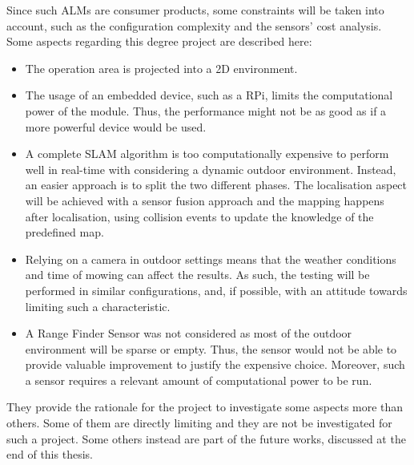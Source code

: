 
Since such \glspl{ALM} are consumer products, some constraints will be taken into account, such as the configuration complexity and the sensors' cost analysis.
Some aspects regarding this degree project are described here:
\begin{itemize}
    \item The operation area is projected into a \Gls{2D} environment.
    \item The usage of an embedded device, such as a \gls{RPi}, limits the computational power of the module. Thus, the performance might not be as good as if a more powerful device would be used. %
    \item A complete \gls{SLAM} algorithm is too computationally expensive to perform well in real-time with considering a dynamic outdoor environment.
    Instead, an easier approach is to split the two different phases.
    The localisation aspect will be achieved with a sensor fusion approach and the mapping happens after localisation, using collision events to update the knowledge of the predefined map.%
    \item Relying on a camera in outdoor settings means that the weather conditions and time of mowing can affect the results.
    As such, the testing will be performed in similar configurations, and, if possible, with an attitude towards limiting such a characteristic.
    \item A Range Finder Sensor was not considered as most of the outdoor environment will be sparse or empty.
    Thus, the sensor would not be able to provide valuable improvement to justify the expensive choice.
    Moreover, such a sensor requires a relevant amount of computational power to be run.
\end{itemize}
They provide the rationale for the project to investigate some aspects more than others.
Some of them are directly limiting and they are not be investigated for such a project.
Some others instead are part of the future works, discussed at the end of this thesis.


